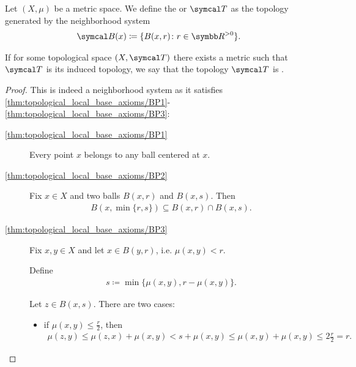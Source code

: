 \begin{definition}\label{def:metric_topology}\cite[249]{Engelking1989}
  Let \( (X, \mu) \) be a metric space. We define the  or  \( \Cal{T} \) as the topology generated by the neighborhood system
  \begin{align*}
    \Cal{B}(x) \coloneqq \{ B (x, r) \colon r \in \BB{R}^{>0} \}.
  \end{align*}

  If for some topological space \( (X, \Cal{T}) \) there exists a metric such that \( \Cal{T} \) is its induced topology, we say that the topology \( \Cal{T} \) is .
\end{definition}
\begin{proof}
  This is indeed a neighborhood system as it satisfies \ref{thm:topological_local_base_axioms/BP1}-\ref{thm:topological_local_base_axioms/BP3}:

  \begin{description}
    \item[\ref{thm:topological_local_base_axioms/BP1}] Every point \( x \) belongs to any ball centered at \( x \).

    \item[\ref{thm:topological_local_base_axioms/BP2}] Fix \( x \in X \) and two balls \( B(x, r) \) and \( B(x, s) \). Then
    \begin{align*}
      B(x, \min\{ r, s \}) \subseteq B(x, r) \cap B(x, s).
    \end{align*}

    \item[\ref{thm:topological_local_base_axioms/BP3}] Fix \( x, y \in X \) and let \( x \in B(y, r) \), i.e. \( \mu(x, y) < r \).

    Define
    \begin{align*}
      s \coloneqq \min\{ \mu(x, y), r - \mu(x, y) \}.
    \end{align*}

    Let \( z \in B(x, s) \). There are two cases:
    \begin{itemize}
      \item if \( \mu(x, y) \leq \tfrac r 2 \), then
      \begin{align*}
        \mu(z, y)
        \leq
        \mu(z, x) + \mu(x, y)
        <
        s + \mu(x, y)
        \leq
        \mu(x, y) + \mu(x, y)
        \leq
        2 \tfrac r 2
        =
        r.
      \end{align*}


\end{itemize}
\end{description}
\end{proof}
